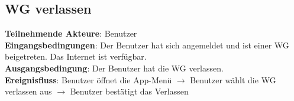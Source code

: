 \begin{flushleft}
		\subsection{WG verlassen}
		\textbf{Teilnehmende Akteure}: Benutzer \\
		\textbf{Eingangsbedingungen}: Der Benutzer hat sich angemeldet und ist einer WG beigetreten. Das Internet ist verfügbar. \\
		\textbf{Ausgangsbedingung}: Der Benutzer hat die WG verlassen. \\
		\textbf{Ereignisfluss}: Benutzer öffnet die App-Menü $\rightarrow$ Benutzer wählt die WG verlassen aus $\rightarrow$ Benutzer bestätigt das Verlassen
\end{flushleft}